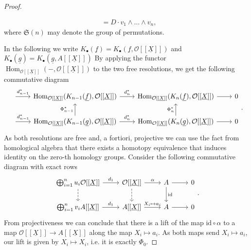 \documentclass{article}
\theoremstyle{plain}%
\theoremstyle{definition}
\theoremstyle{remark}
\renewcommand{\hom}{\operatorname{Hom}}
\begin{document}
\begin{proof}
\begin{enumerate}
\begin{align*}
            &= D \cdot v_1 \wedge \dots \wedge v_n,
        \end{align*}
        where \(\mathfrak{S}(n)\) may denote the group of permutations.
    \end{enumerate}
    In the following we write 
    \(K_\bullet(\underline{f}) = K_\bullet(\underline{f}, \mathcal{O}[[\underline{X}]])\)
    and 
    \(K_\bullet(\underline{g}) = K_\bullet(\underline{g}, A[[\underline{X}]])\)
    By applying the functor \(\hom_{\mathcal{O}[[\underline{X}]]}(-, \mathcal{O}[[\underline{X}]])\)
    to the two free resolutions, we get the following commutative diagram
    \[
        \begin{tikzcd}[column sep=2.2em]
            \arrow[r, "d_{n-1}^*"] & 
            \hom_{\mathcal{O}[[\underline{X}]]}(K_{n-1}(\underline{f}), \mathcal{O}[[\underline{X}]]) 
            \arrow[r, "d_n^*"] &
            \hom_{\mathcal{O}[[\underline{X}]]}(K_n(\underline{f}), \mathcal{O}[[\underline{X}]]) 
            \arrow[r] & 0\\
            \arrow[r, "d_{n-1}^*"] & 
            \hom_{\mathcal{O}[[\underline{X}]]}(K_{n-1}(\underline{g}), \mathcal{O}[[\underline{X}]])
            \arrow[r, "d_n^*"] \arrow[u, "\Phi_{n-1}^*"] &
            \hom_{\mathcal{O}[[\underline{X}]]}(K_n(\underline{g}), \mathcal{O}[[\underline{X}]]) 
            \arrow[r] \arrow[u, "\Phi_{n}^*"] & 0
        \end{tikzcd}.
    \]
    As both resolutions are free and, a fortiori, projective we can use the fact from homological algebra
    that there exists a homotopy equivalence that induces identity on the zero-th homology groups.
    Consider the following commutative diagram with exact rows
    \[
            \begin{tikzcd}
                \bigoplus_{i=1}^n u_i \mathcal{O}[[\underline{X}]] \arrow[r, "d_1"] \arrow[d, dashed] 
                &\mathcal{O}[[\underline{X}]]  \arrow[r, "\alpha"] \arrow[d, dashed] & A \arrow[r] \arrow[d, "\mathrm{id}"] & 0\\
                \bigoplus_{i=1}^n v_i A[[\underline{X}]] \arrow[r, "d_1"] 
                & A[[\underline{X}]] \arrow[r, "X_i \mapsto a_i"] & A \arrow[r] & 0
            \end{tikzcd}.
        \]
    From projectiveness we can conclude that there is a lift of the map \(\mathrm{id} \circ \alpha\) to a map 
    \(\mathcal{O}[[\underline{X}]] \to A[[\underline{X}]]\) along the map \(X_i \mapsto a_i\). 
    As both maps send \(X_i \mapsto a_i\), our lift is given by \(X_i \mapsto X_i\), i.e. it is exactly \(\Phi_0\).

\end{proof}
\end{document}
